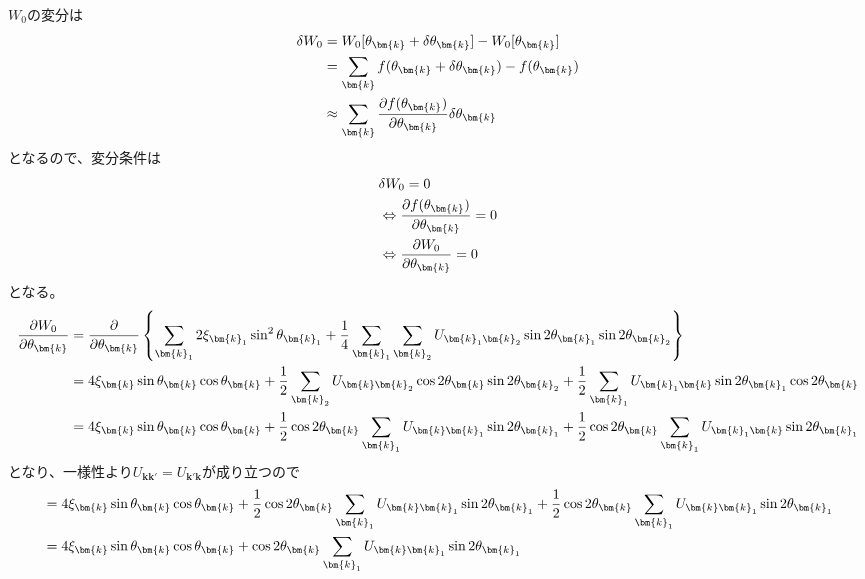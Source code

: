 \documentclass[dvipdfmx, 11pt, a4paper]{jsarticle}
\numberwithin{equation}{section}
\theoremstyle{definition}
\begin{document}
    \begin{derivationBox}
        $W_0$の変分は
        \begin{align}
            \delta W_0 &= W_0[\theta_{\bm{k}} + \delta \theta_{\bm{k}}] - W_0 [\theta_{\bm{k}}] \notag \\
            &= \sum_{\bm{k}} f(\theta_{\bm{k}} + \delta \theta_{\bm{k}}) - f(\theta_{\bm{k}}) \notag \\
            &\approx \sum_{\bm{k}} \frac{\partial f (\theta_{\bm{k}})}{\partial \theta_{\bm{k}}} \delta \theta_{\bm{k}}
        \end{align}
        となるので、変分条件は
        \begin{align}
            &\delta W_0 = 0\notag \\
            &\Leftrightarrow \frac{\partial f (\theta_{\bm{k}})}{\partial \theta_{\bm{k}}} = 0 \notag \\
            &\Leftrightarrow \frac{\partial W_0}{\partial \theta_{\bm{k}}} = 0
        \end{align}
        となる。
        \begin{align}
            \frac{\partial W_0}{\partial \theta_{\bm{k}}} &= \frac{\partial }{\partial \theta_{\bm{k}}} \left\{ \sum_{\bm{k}_1}2\xi_{\bm{k}_1} \sin ^2 \theta_{\bm{k}_1} + \frac{1}{4} \sum_{\bm{k}_1}\sum_{\bm{k}_2} U_{\bm{k}_1\bm{k}_2} \sin 2\theta_{\bm{k}_1} \sin 2\theta_{\bm{k}_2} \right\} \notag \\
            &= 4\xi_{\bm{k}} \sin \theta_{\bm{k}} \cos \theta_{\bm{k}}+\frac{1}{2}  \sum_{\bm{k}_2} U_{\bm{k}\bm{k}_2} \cos 2\theta_{\bm{k}} \sin 2 \theta_{\bm{k}_2} +\frac{1}{2}  \sum_{\bm{k}_1} U_{\bm{k}_1\bm{k}} \sin 2\theta_{\bm{k}_1} \cos 2 \theta_{\bm{k}} \notag \\
            &= 4\xi_{\bm{k}} \sin \theta_{\bm{k}} \cos \theta_{\bm{k}}+\frac{1}{2}  \cos 2\theta_{\bm{k}}\sum_{\bm{k}_1} U_{\bm{k}\bm{k}_1}  \sin 2 \theta_{\bm{k}_1} +\frac{1}{2}  \cos 2 \theta_{\bm{k}}\sum_{\bm{k}_1} U_{\bm{k}_1\bm{k}} \sin 2\theta_{\bm{k}_1}  
        \end{align}
        となり、一様性より$U_{\bm{k}\bm{k}'} = U_{\bm{k}'\bm{k}}$が成り立つので
        \begin{align}
            &= 4\xi_{\bm{k}} \sin \theta_{\bm{k}} \cos \theta_{\bm{k}}+\frac{1}{2}  \cos 2\theta_{\bm{k}}\sum_{\bm{k}_1} U_{\bm{k}\bm{k}_1}  \sin 2 \theta_{\bm{k}_1} +\frac{1}{2}  \cos 2 \theta_{\bm{k}}\sum_{\bm{k}_1} U_{\bm{k}\bm{k}_1} \sin 2\theta_{\bm{k}_1} \notag \\
            &= 4\xi_{\bm{k}} \sin \theta_{\bm{k}} \cos \theta_{\bm{k}}+  \cos 2\theta_{\bm{k}}\sum_{\bm{k}_1} U_{\bm{k}\bm{k}_1}  \sin 2 \theta_{\bm{k}_1}

\end{align}
\end{derivationBox}
\end{document}
